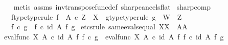 \begin{isabellebody}
%
\isadelimproof
\ \ %
\endisadelimproof
%
\isatagproof
{}\isamarkupfalse%
\ {\isacharparenleft}{\kern0pt}metis\ assms\ inv{\isacharunderscore}{\kern0pt}transpose{\isacharunderscore}{\kern0pt}func{\isacharunderscore}{\kern0pt}def{}\ sharp{\isacharunderscore}{\kern0pt}cancels{\isacharunderscore}{\kern0pt}flat{\isacharparenright}{\kern0pt}%
\endisatagproof
{\isafoldproof}%
%
\isadelimproof
\isanewline
%
\endisadelimproof
\isanewline
{}\isamarkupfalse%
\ sharp{\isacharunderscore}{\kern0pt}comp{\isacharcolon}{\kern0pt}\isanewline
\ \ \ f{\isacharunderscore}{\kern0pt}type{\isacharbrackleft}{\kern0pt}type{\isacharunderscore}{\kern0pt}rule{\isacharbrackright}{\kern0pt}{\isacharcolon}{\kern0pt}\ {\isachardoublequoteopen}f\ {\isacharcolon}{\kern0pt}\ A\ {\isasymtimes}\isactrlsub c\ Z\ {\isasymrightarrow}\ X{\isachardoublequoteclose}\ \ g{\isacharunderscore}{\kern0pt}type{\isacharbrackleft}{\kern0pt}type{\isacharunderscore}{\kern0pt}rule{\isacharbrackright}{\kern0pt}{\isacharcolon}{\kern0pt}\ {\isachardoublequoteopen}g\ {\isacharcolon}{\kern0pt}\ W\ {\isasymrightarrow}\ Z{\isachardoublequoteclose}\isanewline
\ \ \ {\isachardoublequoteopen}f\isactrlsup {\isasymsharp}\ {\isasymcirc}\isactrlsub c\ g\ {\isacharequal}{\kern0pt}\ {\isacharparenleft}{\kern0pt}f\ {\isasymcirc}\isactrlsub c\ {\isacharparenleft}{\kern0pt}id\ A\ {\isasymtimes}\isactrlsub f\ g{\isacharparenright}{\kern0pt}{\isacharparenright}{\kern0pt}\isactrlsup {\isasymsharp}{\isachardoublequoteclose}\isanewline
%
\isadelimproof
%
\endisadelimproof
%
\isatagproof
{}\isamarkupfalse%
\ {\isacharparenleft}{\kern0pt}etcs{\isacharunderscore}{\kern0pt}rule\ same{\isacharunderscore}{\kern0pt}evals{\isacharunderscore}{\kern0pt}equal{\isacharbrackleft}{\kern0pt}\ X{\isacharequal}{\kern0pt}X{\isacharcomma}{\kern0pt}\ \ A{\isacharequal}{\kern0pt}A{\isacharbrackright}{\kern0pt}{\isacharparenright}{\kern0pt}\isanewline
\isanewline
\ \ \isamarkupfalse%
\ {\isachardoublequoteopen}eval{\isacharunderscore}{\kern0pt}func\ X\ A\ {\isasymcirc}\isactrlsub c\ {\isacharparenleft}{\kern0pt}id\ A\ {\isasymtimes}\isactrlsub f\ {\isacharparenleft}{\kern0pt}f\isactrlsup {\isasymsharp}\ {\isasymcirc}\isactrlsub c\ g{\isacharparenright}{\kern0pt}{\isacharparenright}{\kern0pt}\ {\isacharequal}{\kern0pt}\ eval{\isacharunderscore}{\kern0pt}func\ X\ A\ {\isasymcirc}\isactrlsub c\ {\isacharparenleft}{\kern0pt}id\ A\ {\isasymtimes}\isactrlsub f\ f\isactrlsup {\isasymsharp}{\isacharparenright}{\kern0pt}\ {\isasymcirc}\isactrlsub c\ {\isacharparenleft}{\kern0pt}id\ A\ {\isasymtimes}\isactrlsub f\ g{\isacharparenright}{\kern0pt}{\isachardoublequoteclose}\isanewline

\end{isabellebody}
